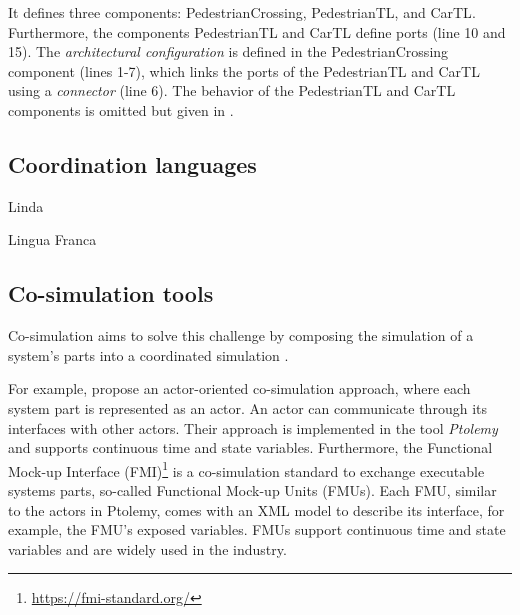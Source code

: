 \documentclass[runningheads]{llncs}
\begin{document}
It defines three components: \textsf{PedestrianCrossing}, \textsf{PedestrianTL}, and \textsf{CarTL}.
Furthermore, the components \textsf{PedestrianTL} and \textsf{CarTL} define ports (line 10 and 15).
The \textit{architectural configuration} is defined in the \textsf{PedestrianCrossing} component (lines 1-7), which links the ports of the \textsf{PedestrianTL} and \textsf{CarTL} using a \textit{connector} (line 6).
The behavior of the \textsf{PedestrianTL} and \textsf{CarTL} components is omitted but given in \cite{timkrauterArtifactsCoordination2024}.

\subsection{Coordination languages}

Linda \cite{carrieroLindaContext1989}
\cite{papadopoulosCoordinationModelsLanguages1998}

Lingua Franca \cite{lohstrohLinguaFrancaDeterministic2021}

\subsection{Co-simulation tools}
\cite{gomesCoSimulationSurvey2019} %

Co-simulation aims to solve this challenge by composing the simulation of a system's parts into a coordinated simulation \cite{gomesCoSimulationSurvey2019}.

For example, \cite{ekerTamingHeterogeneityPtolemy2003} propose an actor-oriented co-simulation approach, where each system part is represented as an actor.
An actor can communicate through its interfaces with other actors.
Their approach is implemented in the tool \textit{Ptolemy} and supports continuous time and state variables.
Furthermore, the Functional Mock-up Interface (FMI)\footnote{\url{https://fmi-standard.org/}} is a co-simulation standard to exchange executable systems parts, so-called Functional Mock-up Units (FMUs).
Each FMU, similar to the actors in Ptolemy, comes with an XML model to describe its interface, for example, the FMU's exposed variables.
FMUs support continuous time and state variables and are widely used in the industry.
\end{document}
